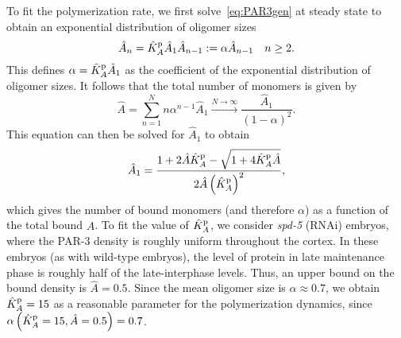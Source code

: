 \documentclass[11pt]{article}
\newcommand{\6}[1]{#1_{\text{6}}}
\newcommand{\3}[1]{#1_{\text{3}}}
\begin{document}
To fit the polymerization rate, we first solve\ \eqref{eq:PAR3gen} at steady state to obtain an exponential distribution of oligomer sizes \cite{edelstein1998models,lang2022oligomerization}
\begin{equation}
\label{eq:QSS}
\hat A_n =  \hat{K}^\text{p}_A \hat A_1 \hat A_{n-1}:=\alpha \hat A_{n-1} \quad n \geq 2.
\end{equation}
This defines $\alpha= \hat{K}^\text{p}_A \hat A_1$ as the coefficient of the exponential distribution of oligomer sizes. It follows that the total number of monomers is given by 
\begin{equation}
\hat A = \sum_{n=1}^N n \alpha^{n-1} \hat A_1 \xrightarrow{N \rightarrow \infty} \frac{\hat A_1}{\left(1-\alpha\right)^2}.
\end{equation}
This equation can then be solved for $\hat A_1$ to obtain \cite[Eq.~(12)]{lang2022oligomerization}
\begin{equation}
\label{eq:AmonA}
\hat A_1 = \frac{1+2\hat A \hat{K}^\text{p}_A-\sqrt{1+4 \hat{K}^\text{p}_A \hat A}}{2 \hat A \left(\hat{K}^\text{p}_A\right)^2},
\end{equation}
which gives the number of bound monomers (and therefore $\alpha$) as a function of the total bound $\hat A$. To fit the value of $\hat{K}^\text{p}_A$, we consider \textit{spd-5} (RNAi) embryos, where the PAR-3 density is roughly uniform throughout the cortex. In these embryos (as with wild-type embryos), the level of protein in late maintenance phase is roughly half of the late-interphase levels. Thus, an upper bound on the bound density is $\hat A=0.5$. Since the mean oligomer size is $\alpha \approx 0.7$, we obtain $\hat{K}^\text{p}_A = 15$ as a reasonable parameter for the polymerization dynamics, since $\alpha\left(\hat{K}^\text{p}_A = 15,\hat A = 0.5\right)=0.7$.
\end{document}

